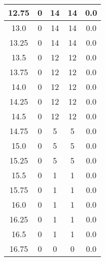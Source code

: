 \documentclass[letterpaper, 12pt]{article}
\begin{document}
\begin{longtable}{|c|c|c|c|c|}
\hline
12.75 & 0 & 14 & 14 & 0.0 \\
\hline
13.0 & 0 & 14 & 14 & 0.0 \\
\hline
13.25 & 0 & 14 & 14 & 0.0 \\
\hline
13.5 & 0 & 12 & 12 & 0.0 \\
\hline
13.75 & 0 & 12 & 12 & 0.0 \\
\hline
14.0 & 0 & 12 & 12 & 0.0 \\
\hline
14.25 & 0 & 12 & 12 & 0.0 \\
\hline
14.5 & 0 & 12 & 12 & 0.0 \\
\hline
14.75 & 0 & 5 & 5 & 0.0 \\
\hline
15.0 & 0 & 5 & 5 & 0.0 \\
\hline
15.25 & 0 & 5 & 5 & 0.0 \\
\hline
15.5 & 0 & 1 & 1 & 0.0 \\
\hline
15.75 & 0 & 1 & 1 & 0.0 \\
\hline
16.0 & 0 & 1 & 1 & 0.0 \\
\hline
16.25 & 0 & 1 & 1 & 0.0 \\
\hline
16.5 & 0 & 1 & 1 & 0.0 \\
\hline
16.75 & 0 & 0 & 0 & 0.0 \\
\hline
\end{longtable}
\end{document}
